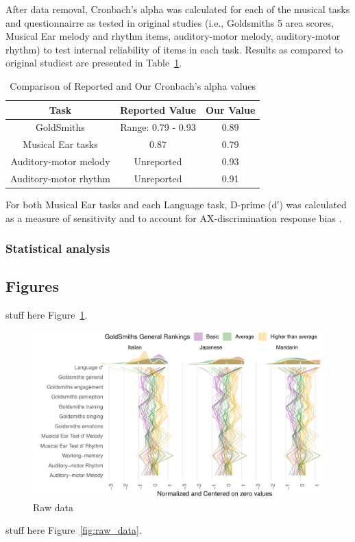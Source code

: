\documentclass[a4paper]{article}
\begin{document}
After data removal, Cronbach's alpha was calculated for each of the musical tasks and questionnairre as tested in original studies (i.e., Goldsmiths 5 area scores, Musical Ear melody and rhythm items, auditory-motor melody, auditory-motor rhythm) to test internal reliability of items in each task. Results as compared to original studiest are presented in Table~\ref{tab:comparison}. 

\begin{table}[ht]
\centering
\begin{tabular}{|c|c|c|}
\hline
\textbf{Task} & \textbf{Reported Value} & \textbf{Our Value} \\
\hline
GoldSmiths \cite{Müllensiefen_Gingras_Musil_Stewart_2014} & Range: 0.79 - 0.93 & 0.89 \\
Musical Ear tasks \cite{Wallentin_Nielsen_Friis-Olivarius_Vuust_Vuust_2010}& 0.87 & 0.79 \\
Auditory-motor melody \cite{Kachlicka_Saito_Tierney_2019}& Unreported & 0.93 \\
Auditory-motor rhythm\cite{Kachlicka_Saito_Tierney_2019}& Unreported & 0.91 \\
\hline
\end{tabular}
\caption{Comparison of Reported and Our Cronbach's alpha values}
\label{tab:comparison}
\end{table}

For both Musical Ear tasks and each Language task,  D-prime (d′) was calculated as a measure of sensitivity and to account for AX-discrimination response bias \cite{Macmillan_Creelman_2004}.

\subsubsection{Statistical analysis}



\subsection{Figures}

stuff here Figure~\ref{fig:raw_sorted_data}.

\begin{figure}[t]
  \centering
  \includegraphics[width=\textwidth]{SP_24_visuals/by_gs.pdf}
  \caption{Raw data}
  \label{fig:raw_sorted_data}
\end{figure}
stuff here Figure~\ref{fig:raw_data}.
\end{document}
